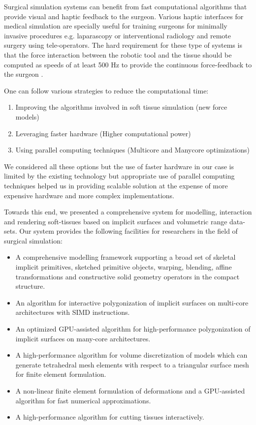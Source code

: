 \label{chapter:conclusion}
Surgical simulation systems can benefit from fast computational algorithms that provide visual and haptic feedback to the surgeon. 
Various haptic interfaces for medical simulation are specially useful for training surgeons for minimally invasive procedures e.g.
laparascopy or interventional radiology and remote surgery using tele-operators. The hard requirement for these type of systems is
that the force interaction between the robotic tool and the tissue should be computed as speeds of at least 500 Hz to provide the 
continuous force-feedback to the surgeon \cite{dimaio2005interactive, Otaduy2005}.

One can follow various strategies to reduce the computational time:

\begin{enumerate}
 \item Improving the algorithms involved in soft tissue simulation (new force models)
 \item Leveraging faster hardware (Higher computational power)
 \item Using parallel computing techniques (Multicore and Manycore optimizations)
\end{enumerate}

We considered all these options but the use of faster hardware in our case is limited by the existing technology but appropriate 
use of parallel computing techniques helped us in providing scalable solution at the expense of more expensive hardware and more 
complex implementations.

Towards this end, we presented a comprehensive system for modelling, interaction and rendering soft-tissues based on implicit surfaces and volumetric range data-sets.
Our system provides the following facilities for researchers in the field of surgical simulation:

\begin{itemize}
 \item A comprehensive modelling framework supporting a broad set of skeletal implicit primitives, sketched primitive objects, warping, blending, 
 affine transformations and constructive solid geometry operators in the compact \blob structure.
 \item An algorithm for interactive polygonization of implicit surfaces on multi-core architectures with SIMD instructions.
 \item An optimized GPU-assisted algorithm for high-performance polygonization of implicit surfaces on many-core architectures.
 \item A high-performance algorithm for volume discretization of \blob models which can generate tetrahedral mesh elements with respect to a triangular 
 surface mesh for finite element formulation.
 \item A non-linear finite element formulation of deformations and a GPU-assisted algorithm for fast numerical approximations.
 \item A high-performance algorithm for cutting tissues interactively. 
\end{itemize}


